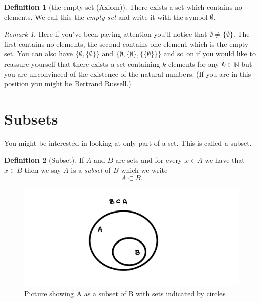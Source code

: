 \documentclass[
]{book}
\theoremstyle{definition}
\newtheorem{definition}{Definition}[chapter]
\theoremstyle{definition}
\theoremstyle{definition}
\theoremstyle{definition}
\theoremstyle{remark}
\newtheorem*{remark}{Remark}
\begin{document}
\begin{definition}[the empty set (Axiom)]
There exists a set which contains no elements. We call this the \emph{empty set} and write it with the symbol \(\emptyset\).
\end{definition}

\begin{remark}
Here if you've been paying attention you'll notice that \(\emptyset \neq \{\emptyset\}\). The first contains no elements, the second contains one element which is the empty set. You can also have \(\{\emptyset, \{\emptyset\}\}\) and \(\{\emptyset, \{\emptyset\}, \{\{\emptyset\}\}\}\) and so on if you would like to reassure yourself that there exists a set containing \(k\) elements for any \(k \in \mathbb{N}\) but you are unconvinced of the existence of the natural numbers. (If you are in this position you might be Bertrand Russell.)
\end{remark}

\section{Subsets}\label{subsets}

You might be interested in looking at only part of a set. This is called a subset.

\begin{definition}[Subset]

If \(A\) and \(B\) are sets and for every \(x \in A\) we have that \(x \in B\) then we say \(A\) is a \emph{subset} of \(B\) which we write
\[ A \subset B.  \]

\begin{figure}
\centering
\includegraphics{subset.png}
\caption{\label{fig:unnamed-chunk-1}Picture showing A as a subset of B with sets indicated by circles}
\end{figure}

\end{definition}
\end{document}
